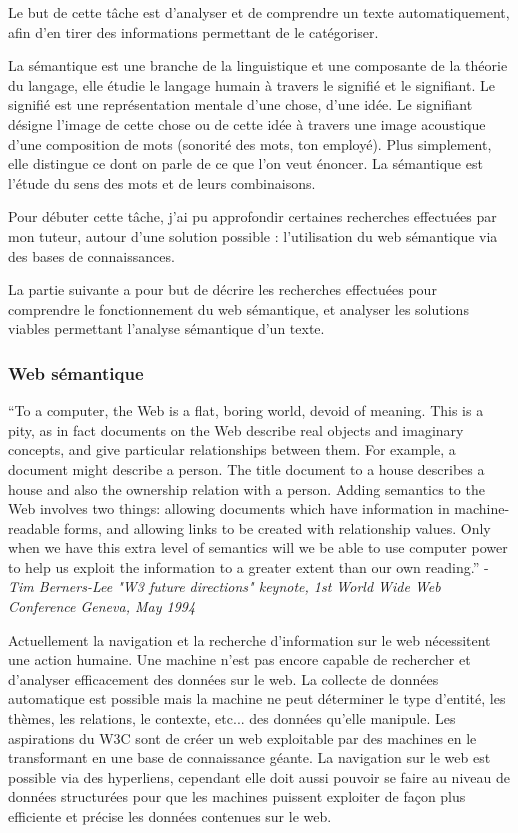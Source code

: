 \documentclass[french]{article}
\begin{document}
{Le but de cette tâche est d'analyser et de comprendre un texte automatiquement, afin d'en tirer des informations permettant de le catégoriser.

La sémantique est une branche de la linguistique et une composante de la théorie du langage, elle étudie le langage humain à travers le signifié et le signifiant. Le signifié est une représentation mentale d'une chose, d'une idée. Le signifiant désigne l'image de cette chose ou de cette idée à travers une image acoustique d'une composition de mots (sonorité des mots, ton employé). Plus simplement, elle distingue ce dont on parle de ce que l'on veut énoncer. La sémantique est l'étude du sens des mots et de leurs combinaisons. \cite{wikipedia-semantique}

Pour débuter cette tâche, j'ai pu approfondir certaines recherches effectuées par mon tuteur, autour d'une solution possible : l'utilisation du web sémantique via des bases de connaissances.

La partie suivante a pour but de décrire les recherches effectuées pour comprendre le fonctionnement du web sémantique, et analyser les solutions viables permettant l'analyse sémantique d'un texte.

\subsubsection{Web sémantique}

\enquote{To a computer, the Web is a flat, boring world, devoid of meaning. This is a pity, as in fact documents on the Web describe real objects and imaginary concepts, and give particular relationships between them. For example, a document might describe a person. The title document to a house describes a house and also the ownership relation with a person. Adding semantics to the Web involves two things: allowing documents which have information in machine-readable forms, and allowing links to be created with relationship values. Only when we have this extra level of semantics will we be able to use computer power to help us exploit the information to a greater extent than our own reading.} - \textit{Tim Berners-Lee "W3 future directions" keynote, 1st World Wide Web Conference Geneva, May 1994} \cite{tim}

Actuellement la navigation et la recherche d'information sur le web nécessitent une action humaine. Une machine n'est pas encore capable de rechercher et d'analyser efficacement des données sur le web. La collecte de données automatique est possible mais la machine ne peut déterminer le type d'entité, les thèmes, les relations, le contexte, etc... des données qu'elle manipule.
Les aspirations du W3C sont de créer un web exploitable par des machines en le transformant en une base de connaissance géante.
La navigation sur le web est possible via des hyperliens, cependant elle doit aussi pouvoir se faire au niveau de données structurées pour que les machines puissent exploiter de façon plus efficiente et précise les données contenues sur le web.

}
\end{document}
